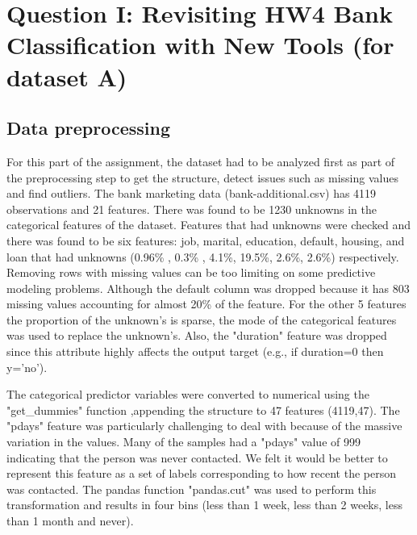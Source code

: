 \section{Question I: Revisiting HW4 Bank Classification with New Tools (for dataset A)}
\subsection{Data preprocessing}
For this part of the assignment, the dataset had to be analyzed first as part of the preprocessing step to get the structure, detect issues such as missing values and find outliers. The bank marketing data (bank-additional.csv) has 4119 observations and 21 features. There was found to be 1230 unknowns in the categorical features of the dataset. Features that had unknowns were checked and there was found to be six features: job, marital, education, default, housing, and  loan that had unknowns (0.96\% , 0.3\% , 4.1\%, 19.5\%, 2.6\%, 2.6\%) respectively. Removing rows with missing values can be too limiting on some predictive modeling problems. Although the default  column was dropped because it has 803 missing values accounting for almost 20\% of the feature. For the other 5 features the proportion of the unknown's is sparse, the mode of the categorical features was used to replace the unknown's. Also, the "duration" feature was dropped since this attribute highly affects the output target (e.g., if duration=0 then y='no').

The categorical predictor variables  were converted  to numerical using the "get\_dummies" function ,appending the structure to 47 features (4119,47).
The "pdays" feature was particularly challenging to deal with because of the massive variation in the values. Many of the samples had a "pdays" value of 999 indicating that the person was never contacted. We felt it would be better to represent this feature as a set of labels corresponding to how recent the person was contacted. The pandas function "pandas.cut" was used to perform this transformation and results in four bins (less than 1 week, less than 2 weeks, less than 1 month and never).

